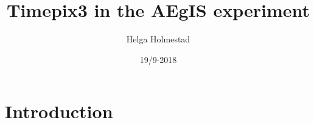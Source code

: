 \documentclass{beamer}
\title[]{Timepix3 in the AEgIS experiment}
\author{Helga Holmestad}
\institute{University of Oslo}
\date{19/9-2018}
\begin{document}
\begin{frame}
  \titlepage
\end{frame}


\section{Introduction}

      
\end{document}
